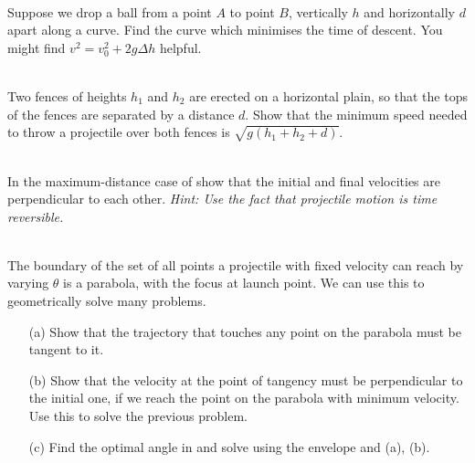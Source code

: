 \begin{exc}
        \begin{exercise}[subtitle={Brachistochrone}, points = 4]
            \smallskip
            ~\\
            Suppose we drop a ball from a point $A$ to point $B$, vertically $h$ and horizontally $d$ apart along a 
            curve. Find the curve which minimises the time of descent. You might find $v^2 = v_0^2 + 2g\Delta h$ helpful.
        \end{exercise}

        \begin{exercise}[subtitle={Jumping over Roofs, Kalda}, points = 3]
            \smallskip
            ~\\
            Two fences of heights $h_1$ and $h_2$ are erected on a horizontal plain, so that the tops
            of the fences are separated by a distance $d$. Show that the minimum speed needed to throw a
            projectile over both fences is $\sqrt{g(h_1 + h_2 + d)}$.
            \label{exc: kaldaroof}
        \end{exercise}

        \begin{exercise}[subtitle={Perpendicular Velocities, Morin}, points = 3]
            \smallskip
            ~\\
            In the maximum-distance case of 
            show that the initial and final velocities are perpendicular to each other. \emph{Hint: Use the fact 
            that projectile motion is time reversible.}
        \end{exercise}

        \begin{exercise}[subtitle={Parabolic Envelope, Knzhou}, points = 5]
            \smallskip
            ~\\
            The boundary of the set of all points a projectile with fixed velocity can reach by varying $\theta$ is 
            a parabola, with the focus at launch point. We can use this to geometrically solve many problems.
            \begin{enumerate}
                \item[(a)] Show that the trajectory that touches any point on the parabola must be tangent to it.
                \item[(b)] Show that the velocity at the point of tangency must be perpendicular to the initial one, if 
                we reach the point on the parabola with minimum velocity. Use this to solve the previous problem.
                \item[(c)]  Find the optimal angle in  and solve 
                using the envelope and (a), (b). 
            \end{enumerate}
        \end{exercise}


\end{exc}
